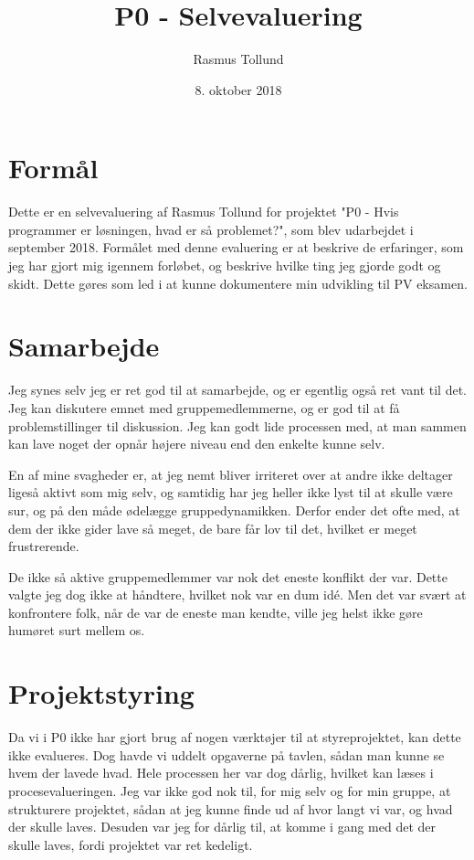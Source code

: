 \documentclass[10pt,a4paper]{article}
\author{Rasmus Tollund}
\title{P0 - Selvevaluering}
\date{8. oktober 2018}
\begin{document}
\maketitle

\section*{Formål}
Dette er en selvevaluering af Rasmus Tollund for projektet "P0 - Hvis programmer er løsningen, hvad er så problemet?", som blev udarbejdet i september 2018. Formålet med denne evaluering er at beskrive de erfaringer, som jeg har gjort mig igennem forløbet, og beskrive hvilke ting jeg gjorde godt og skidt. Dette gøres som led i at kunne dokumentere min udvikling til PV eksamen.

\section*{Samarbejde}
Jeg synes selv jeg er ret god til at samarbejde, og er egentlig også ret vant til det. Jeg kan diskutere emnet med gruppemedlemmerne, og er god til at få problemstillinger til diskussion. Jeg kan godt lide processen med, at man sammen kan lave noget der opnår højere niveau end den enkelte kunne selv.

En af mine svagheder er, at jeg nemt bliver irriteret over at andre ikke deltager ligeså aktivt som mig selv, og samtidig har jeg heller ikke lyst til at skulle være sur, og på den måde ødelægge gruppedynamikken. Derfor ender det ofte med, at dem der ikke gider lave så meget, de bare får lov til det, hvilket er meget frustrerende.

De ikke så aktive gruppemedlemmer var nok det eneste konflikt der var. Dette valgte jeg dog ikke at håndtere, hvilket nok var en dum idé. Men det var svært at konfrontere folk, når de var de eneste man kendte, ville jeg helst ikke gøre humøret surt mellem os.

\section*{Projektstyring}
Da vi i P0 ikke har gjort brug af nogen værktøjer til at styreprojektet, kan dette ikke evalueres. Dog havde vi uddelt opgaverne på tavlen, sådan man kunne se hvem der lavede hvad. Hele processen her var dog dårlig, hvilket kan læses i procesevalueringen. Jeg var ikke god nok til, for mig selv og for min gruppe, at strukturere projektet, sådan at jeg kunne finde ud af hvor langt vi var, og hvad der skulle laves. Desuden var jeg for dårlig til, at komme i gang med det der skulle laves, fordi projektet var ret kedeligt.
\end{document}
